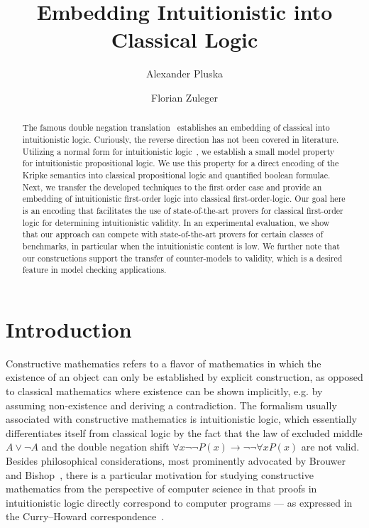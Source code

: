 \documentclass{easychair}
\theoremstyle{definition}
\theoremstyle{definition}
\theoremstyle{definition}
\theoremstyle{definition}
\theoremstyle{definition}
\theoremstyle{definition}
\theoremstyle{definition}
\begin{document}
	\title{Embedding Intuitionistic into Classical Logic}
	\author{Alexander Pluska \and Florian Zuleger}
	\maketitle
\begin{abstract}
The famous double negation translation~\cite{glivenko1929quelques,godel1933intuitionistischen} establishes an embedding of classical into intuitionistic logic.
Curiously, the reverse direction has not been covered in literature.
Utilizing a normal form for intuitionistic logic~\cite{claessen2015sat}, we establish a small model property for intuitionistic propositional logic.
We use this property for a direct encoding of the Kripke semantics into classical propositional logic and quantified boolean formulae.
Next, we transfer the developed techniques to the first order case and provide an embedding of intuitionistic first-order logic into classical first-order-logic.
Our goal here is an encoding that facilitates the use of state-of-the-art provers for classical first-order logic for determining intuitionistic validity.
In an experimental evaluation, we show that our approach can compete with state-of-the-art provers for certain classes of benchmarks, in particular when the intuitionistic content is low.
We further note that our constructions support the transfer of counter-models to validity, which is a desired feature in model checking applications.
\end{abstract}

\section{Introduction}

Constructive mathematics refers to a flavor of mathematics in which the existence of an object can only be established by explicit construction, as opposed to classical mathematics where existence can be shown implicitly, e.g. by assuming non-existence and deriving a contradiction.
The formalism usually associated with constructive mathematics is intuitionistic logic, which essentially differentiates itself from classical logic by the fact that the law of excluded middle $A\vee\neg A$ and the double negation shift $\forall x\neg\neg P(x)\to\neg\neg\forall xP(x)$ are not valid.
Besides philosophical considerations, most prominently advocated by Brouwer~\cite{brouwer1907over} and Bishop~\cite{bishop1967foundations}, there is a particular motivation for studying constructive mathematics from the perspective of computer science in that proofs in intuitionistic logic directly correspond to computer programs --- as expressed in the Curry--Howard correspondence~\cite{howard1980formulae}.
\end{document}
